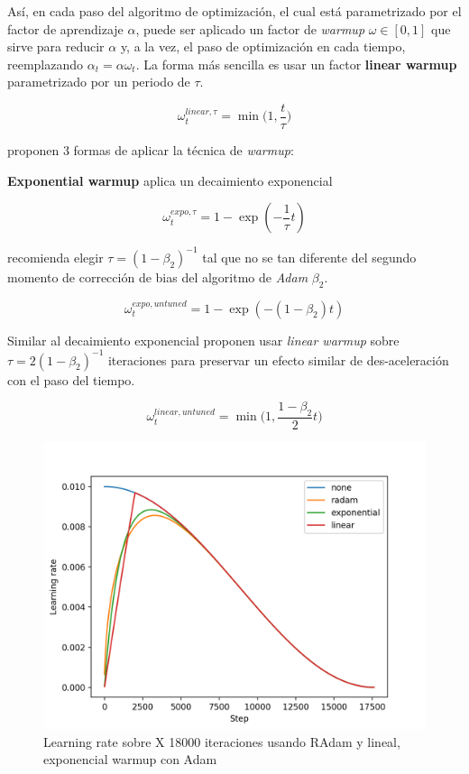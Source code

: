 Así, en cada paso del algoritmo de optimización, el cual está parametrizado por el factor de aprendizaje
$\alpha$, puede ser aplicado un factor de \textit{warmup} $\omega \in [0,1]$ que sirve para reducir
$\alpha$ y, a la vez, el paso de optimización en cada tiempo, reemplazando $\alpha_t = \alpha \omega_t$.
La forma más sencilla es usar un factor \textbf{linear warmup} parametrizado por un periodo de
 $\tau$.

\begin{equation}
    \omega_t^{linear, \tau} = \min\big(1, \frac{t}{\tau} \big)
    \label{eq:warn_linear}
\end{equation}

\citeauthor{DBLP:journals/corr/abs-1910-04209} proponen 3 formas de aplicar la técnica de \textit{warmup}:

\textbf{Exponential warmup} aplica un decaimiento exponencial

\begin{equation}
    \omega_t^{expo, \tau} = 1 - \exp(- \frac{1}{\tau} t)
    \label{eq:warn_expo}
\end{equation}

\noindent recomienda elegir $\tau = (1 - \beta_2)^{-1}$ tal que no se tan diferente del segundo momento de
corrección de bias del algoritmo de \textit{Adam} $\beta_2$.

\begin{equation}
    \omega_t^{expo, untuned} = 1 - \exp(- (1 - \beta_2) t)
    \label{eq:warn_expo_untened}
\end{equation}

Similar al decaimiento exponencial proponen usar \textit{linear warmup} sobre
$\tau = 2 (1 - \beta_2)^{-1}$ iteraciones para preservar un efecto similar de des-aceleración
con el paso del tiempo.

\begin{equation}
    \omega_t^{linear, untuned} = \min\big(1, \frac{1 - \beta_2}{2} t \big)
    \label{eq:warn_linear_untuned}
\end{equation}

\begin{figure}[ht!]
    \centering
    \includegraphics[width=0.5 \textwidth]{Chapters/2. Transformer/Figures/transformer/warmups.png}
    \caption{Learning rate sobre X 18000 iteraciones usando RAdam y lineal, exponencial warmup con Adam}
    \label{fig:warmup}
\end{figure}

